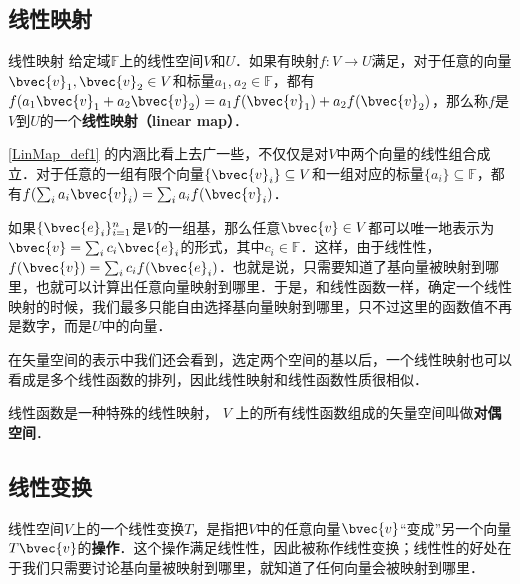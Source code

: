 
\begin{issues}
\issueTODO
{}
\end{issues}



\subsection{线性映射}
\begin{definition}{线性映射}\label{LinMap_def1}
给定域$\mathbb{F}$上的线性空间$V$和$U$．如果有映射$f:V\rightarrow U$满足，对于任意的向量$\bvec{v}_1, \bvec{v}_2\in V$和标量$a_1, a_2\in\mathbb{F}$，都有$f(a_1\bvec{v}_1+a_2\bvec{v}_2)=a_1f(\bvec{v}_1)+a_2f(\bvec{v}_2)$，那么称$f$是$V$到$U$的一个\textbf{线性映射（linear map）}．
\end{definition}


\autoref{LinMap_def1} 的内涵比看上去广一些，不仅仅是对$V$中两个向量的线性组合成立．对于任意的一组有限个向量$\{\bvec{v}_i\}\subseteq V$和一组对应的标量$\{a_i\}\subseteq\mathbb{F}$，都有$f(\sum_i a_i\bvec{v}_i)=\sum_i a_if(\bvec{v}_i)$．

如果$\{\bvec{e}_i\}_{i=1}^n$是$V$的一组基，那么任意$\bvec{v}\in V$都可以唯一地表示为$\bvec{v}=\sum_i c_i\bvec{e}_i$的形式，其中$c_i\in\mathbb{F}$．这样，由于线性性，$f(\bvec{v})=\sum_ic_if(\bvec{e}_i)$．也就是说，只需要知道了基向量被映射到哪里，也就可以计算出任意向量映射到哪里．于是，和线性函数一样，确定一个线性映射的时候，我们最多只能自由选择基向量映射到哪里，只不过这里的函数值不再是数字，而是$U$中的向量．

在矢量空间的表示中我们还会看到，选定两个空间的基以后，一个线性映射也可以看成是多个线性函数的排列，因此线性映射和线性函数性质很相似．

线性函数是一种特殊的线性映射， $V$ 上的所有线性函数组成的矢量空间叫做\textbf{对偶空间}．

\subsection{线性变换}
线性空间$V$上的一个线性变换$T$，是指把$V$中的任意向量$\bvec{v}$“变成”另一个向量$T\bvec{v}$的\textbf{操作}．这个操作满足线性性，因此被称作线性变换；线性性的好处在于我们只需要讨论基向量被映射到哪里，就知道了任何向量会被映射到哪里．

